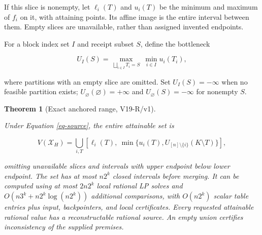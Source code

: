 \documentclass{article}
\newtheorem{theorem}{Theorem}
\theoremstyle{definition}
\begin{document}
If this slice is nonempty, let \(\ell_i(T)\) and \(u_i(T)\) be the
minimum and maximum of \(f_i\) on it, with attaining points. Its affine
image is the entire interval between them. Empty slices are unavailable,
rather than assigned invented endpoints.

For a block index set \(I\) and receipt subset \(S\), define the
bottleneck

\begin{equation}
U_I(S)=\max_{\bigsqcup_{i\in I}T_i=S}\ \min_{i\in I}u_i(T_i),
 \label{eq-bottleneck}
\end{equation}

where partitions with an empty slice are omitted. Set \(U_I(S)=-\infty\)
when no feasible partition exists;
\(U_\varnothing(\varnothing)=+\infty\) and \(U_\varnothing(S)=-\infty\)
for nonempty \(S\).

\begin{theorem}[Exact anchored range, V19-R/v1]\label{thm-range}

Under Equation \ref{eq-source}, the entire attainable set is

\begin{equation}
V(\mathcal X_H)=
 \bigcup_{i,T}
 \left[\ell_i(T),\ \min\{u_i(T),U_{[n]\setminus\{i\}}(K\setminus T)\}\right],
 \label{eq-range}
\end{equation}

omitting unavailable slices and intervals with upper endpoint below
lower endpoint. The set has at most \(n2^k\) closed intervals before
merging. It can be computed using at most \(2n2^k\) local rational LP
solves and \(O(n3^k+n2^k\log(n2^k))\) additional comparisons, with
\(O(n2^k)\) scalar table entries plus input, backpointers, and local
certificates. Every requested attainable rational value has a
reconstructable rational source. An empty union certifies inconsistency
of the supplied premises.

\end{theorem}
\end{document}
